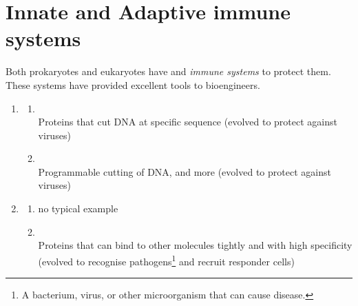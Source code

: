 \section{Innate and Adaptive immune systems}
Both prokaryotes and eukaryotes have  and  \textit{immune systems} to protect them. These systems have provided excellent tools to bioengineers.
\begin{enumerate}
    \item {}
    \begin{enumerate}
        \item {}\\ Proteins that cut DNA at specific sequence (evolved to protect against viruses)
        \item {}\\ Programmable cutting of DNA, and more (evolved to protect against viruses)
    \end{enumerate}
    \item {}
    \begin{enumerate}
        \item {} no typical example
        \item {}\\ Proteins that can bind to other molecules tightly and with high specificity (evolved to recognise pathogens\footnote{A bacterium, virus, or other microorganism that can cause disease.} and recruit responder cells)

    \end{enumerate}
\end{enumerate}
